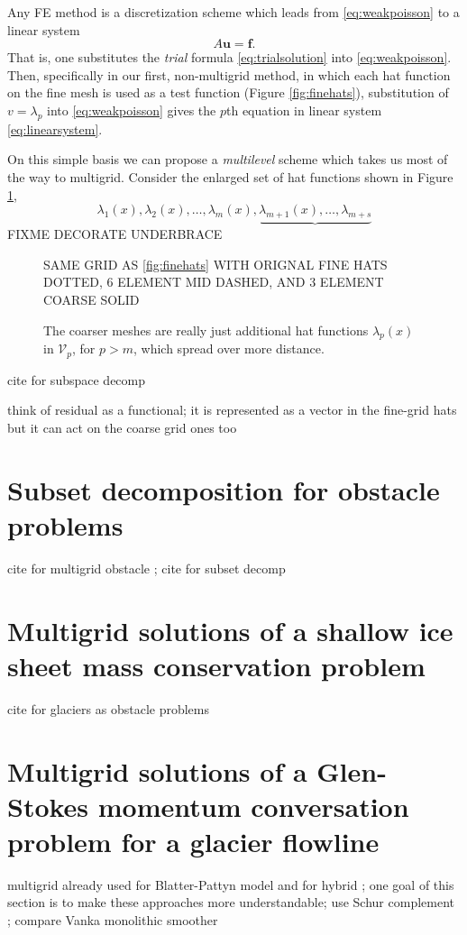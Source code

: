 \documentclass[letterpaper,final,12pt,reqno]{amsart}
\newcommand{\bbf}{\mathbf{f}}
\newcommand{\bu}{\mathbf{u}}
\begin{document}
Any FE method is a discretization scheme which leads from \eqref{eq:weakpoisson} to a linear system
\begin{equation}
A \bu = \bbf. \label{eq:linearsystem}
\end{equation}
That is, one substitutes the \emph{trial} formula \eqref{eq:trialsolution} into \eqref{eq:weakpoisson}.  Then, specifically in our first, non-multigrid method, in which each hat function on the fine mesh is used as a test function (Figure \ref{fig:finehats}), substitution of $v=\lambda_p$ into \eqref{eq:weakpoisson} gives the $p$th equation in linear system \eqref{eq:linearsystem}.

On this simple basis we can propose a \emph{multilevel} scheme which takes us most of the way to multigrid.  Consider the enlarged set of hat functions shown in Figure \ref{fig:multilevelhats},
    $$\lambda_1(x),\lambda_2(x),\dots,\lambda_m(x),\underbrace{\lambda_{m+1}(x),\dots,\lambda_{m+s}}$$
FIXME DECORATE UNDERBRACE

\begin{figure}
SAME GRID AS \eqref{fig:finehats} WITH ORIGNAL FINE HATS DOTTED, 6 ELEMENT MID DASHED, AND 3 ELEMENT COARSE SOLID
\caption{The coarser meshes are really just additional hat functions $\lambda_p(x)$ in $\mathcal{V}_p$, for $p>m$, which spread over more distance.}
\label{fig:multilevelhats}
\end{figure}

cite for subspace decomp \cite{Xu1992}

think of residual as a functional; it is represented as a vector in the fine-grid hats but it can act on the coarse grid ones too


\section{Subset decomposition for obstacle problems} \label{sec:obstacle}


cite for multigrid obstacle \cite{BrandtCryer1983,Bueler2021,GraeserKornhuber2009,Jouvetetal2013}; cite for subset decomp \cite{Tai2003}

\section{Multigrid solutions of a shallow ice sheet mass conservation problem} \label{sec:sia}

cite for glaciers as obstacle problems \cite{Bueler2016,Bueler2020,Calvoetal2002,JouvetBueler2012}

\section{Multigrid solutions of a Glen-Stokes momentum conversation problem for a glacier flowline} \label{sec:stokes}

multigrid already used for Blatter-Pattyn model \cite{BrownSmithAhmadia2013} and for hybrid \cite{Jouvetetal2013}; one goal of this section is to make these approaches more understandable; use Schur complement \cite{Bueler2021,Elmanetal2014}; compare Vanka monolithic smoother \cite{Farrelletal2019}

\small

\bigskip


\end{document}
